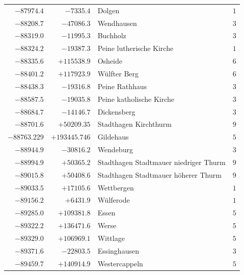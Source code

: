 \begin{center}
\begin{tabular}{r|r|p{170pt}|r}
\(-87974.4\)&\(-7335.4\)&Dolgen&\(1\)\\
\(-88208.7\)&\(-47086.3\)&Wendhausen&\(3\)\\
\(-88319.0\)&\(-11995.3\)&Buchholz&\(3\)\\
\(-88324.2\)&\(-19387.3\)&Peine lutherische Kirche&\(1\)\\
\(-88335.6\)&\(+115538.9\)&Osheide&\(6\)\\
\(-88401.2\)&\(+117923.9\)&Wülfter Berg&\(6\)\\
\(-88438.3\)&\(-19316.8\)&Peine Rathhaus&\(3\)\\
\(-88587.5\)&\(-19035.8\)&Peine katholische Kirche&\(3\)\\
\(-88684.7\)&\(-14146.7\)&Dickensberg&\(3\)\\
\(-88701.6\)&\(+50209.35\)&Stadthagen Kirchthurm&\(9\)\\
\(-88763.229\)&\(+193445.746\)&Gildehaus&\(5\)\\
\(-88944.9\)&\(-30816.2\)&Wendeburg&\(3\)\\
\(-88994.9\)&\(+50365.2\)&Stadthagen Stadtmauer niedriger Thurm&\(9\)\\
\(-89015.8\)&\(+50408.6\)&Stadthagen Stadtmauer höherer Thurm&\(9\)\\
\(-89033.5\)&\(+17105.6\)&Wettbergen&\(1\)\\
\(-89156.2\)&\(+6431.9\)&Wülferode&\(1\)\\
\(-89285.0\)&\(+109381.8\)&Essen&\(5\)\\
\(-89322.2\)&\(+136471.6\)&Werse&\(5\)\\
\(-89329.0\)&\(+106969.1\)&Wittlage&\(5\)\\
\(-89371.6\)&\(-22803.5\)&Essinghausen&\(3\)\\
\(-89459.7\)&\(+140914.9\)&Westercappeln&\(5\)\\
\hline\end{tabular}\endgroup\end{center}
